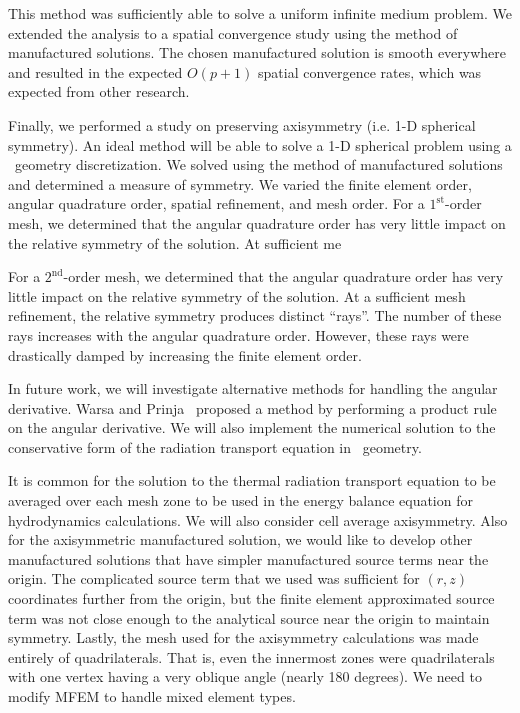 \documentclass[12pt]{article}
\begin{document}
This method was sufficiently able to solve a uniform infinite medium problem. We extended the analysis to a spatial convergence study using the method of manufactured solutions. The chosen manufactured solution is smooth everywhere and resulted in the expected $O(p+1)$ spatial convergence rates, which was expected from other research.

Finally, we performed a study on preserving axisymmetry (i.e. 1-D spherical symmetry). An ideal method will be able to solve a 1-D spherical problem using a \RZ\ geometry discretization. We solved using the method of manufactured solutions and determined a measure of symmetry. We varied the finite element order, angular quadrature order, spatial refinement, and mesh order. For a $1^\text{st}$-order mesh, we determined that the angular quadrature order has very little impact on the relative symmetry of the solution. At sufficient me

For a $2^\text{nd}$-order mesh, we determined that the angular quadrature order has very little impact on the relative symmetry of the solution. At a sufficient mesh refinement, the relative symmetry produces distinct ``rays''. The number of these rays increases with the angular quadrature order. However, these rays were drastically damped by increasing the finite element order.

In future work, we will investigate alternative methods for handling the angular derivative. Warsa and Prinja~\cite{WarsaAngularQuadrature} proposed a method by performing a product rule on the angular derivative. We will also implement the numerical solution to the conservative form of the radiation transport equation in \RZ\ geometry.

It is common for the solution to the thermal radiation transport equation to be averaged over each mesh zone to be used in the energy balance equation for hydrodynamics calculations. We will also consider cell average axisymmetry. Also for the axisymmetric manufactured solution, we would like to develop other manufactured solutions that have simpler manufactured source terms near the origin. The complicated source term that we used was sufficient for $(r,z)$ coordinates further from the origin, but the finite element approximated source term was not close enough to the analytical source near the origin to maintain symmetry. Lastly, the mesh used for the axisymmetry calculations was made entirely of quadrilaterals. That is, even the innermost zones were quadrilaterals with one vertex having a very oblique angle (nearly 180 degrees). We need to modify MFEM to handle mixed element types.



%
%
\end{document}
